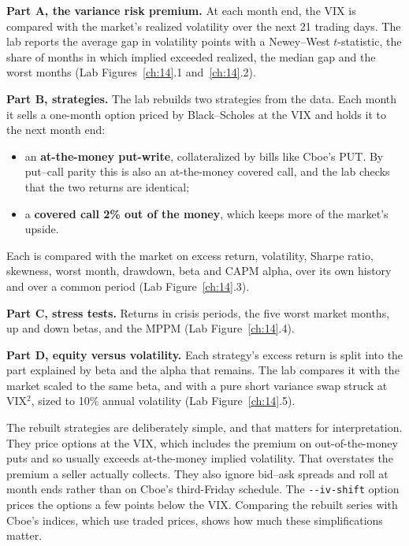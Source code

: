 \textbf{Part A, the variance risk premium.} At each month end, the VIX is compared with the market's realized volatility over the next 21 trading days. The lab reports the average gap in volatility points with a Newey--West $t$-statistic, the share of months in which implied exceeded realized, the median gap and the worst months (Lab Figures~\ref{ch:14}.1 and~\ref{ch:14}.2).

\textbf{Part B, strategies.} The lab rebuilds two strategies from the data. Each month it sells a one-month option priced by Black--Scholes at the VIX and holds it to the next month end:

\begin{itemize}
  \item an \textbf{at-the-money put-write}, collateralized by bills like Cboe's PUT. By put--call parity this is also an at-the-money covered call, and the lab checks that the two returns are identical;
  \item a \textbf{covered call 2\% out of the money}, which keeps more of the market's upside.
\end{itemize}

Each is compared with the market on excess return, volatility, Sharpe ratio, skewness, worst month, drawdown, beta and CAPM alpha, over its own history and over a common period (Lab Figure~\ref{ch:14}.3).

\textbf{Part C, stress tests.} Returns in crisis periods, the five worst market months, up and down betas, and the MPPM (Lab Figure~\ref{ch:14}.4).

\textbf{Part D, equity versus volatility.} Each strategy's excess return is split into the part explained by beta and the alpha that remains. The lab compares it with the market scaled to the same beta, and with a pure short variance swap struck at VIX$^2$, sized to 10\% annual volatility (Lab Figure~\ref{ch:14}.5).

The rebuilt strategies are deliberately simple, and that matters for interpretation. They price options at the VIX, which includes the premium on out-of-the-money puts and so usually exceeds at-the-money implied volatility. That overstates the premium a seller actually collects. They also ignore bid--ask spreads and roll at month ends rather than on Cboe's third-Friday schedule. The \texttt{-{}-iv-shift} option prices the options a few points below the VIX. Comparing the rebuilt series with Cboe's indices, which use traded prices, shows how much these simplifications matter.

